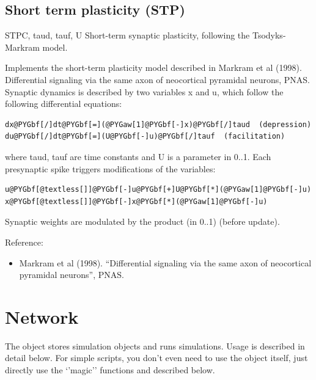 \documentclass[letterpaper,10pt,english]{manual}
\begin{document}
\subsection{Short term plasticity (STP)}

\hypertarget{brian.STP}{}\begin{classdesc}{STP}{C, taud, tauf, U}
Short-term synaptic plasticity, following the Tsodyks-Markram model.

Implements the short-term plasticity model described in Markram et al (1998).
Differential signaling via the same axon of
neocortical pyramidal neurons, PNAS.
Synaptic dynamics is described by two variables x and u, which follow
the following differential equations:

\begin{Verbatim}[commandchars=@\[\]]
dx@PYGbf[/]dt@PYGbf[=](@PYGaw[1]@PYGbf[-]x)@PYGbf[/]taud  (depression)
du@PYGbf[/]dt@PYGbf[=](U@PYGbf[-]u)@PYGbf[/]tauf  (facilitation)
\end{Verbatim}

where taud, tauf are time constants and U is a parameter in 0..1. Each presynaptic
spike triggers modifications of the variables:

\begin{Verbatim}[commandchars=@\[\]]
u@PYGbf[@textless[]]@PYGbf[-]u@PYGbf[+]U@PYGbf[*](@PYGaw[1]@PYGbf[-]u)
x@PYGbf[@textless[]]@PYGbf[-]x@PYGbf[*](@PYGaw[1]@PYGbf[-]u)
\end{Verbatim}

Synaptic weights are modulated by the product  (in 0..1) (before update).

Reference:
\begin{itemize}
\item {} 
Markram et al (1998). ``Differential signaling via the same axon of
neocortical pyramidal neurons'', PNAS.

\end{itemize}
\end{classdesc}

\resetcurrentobjects
\hypertarget{--doc-reference-network}{}

\section{Network}

The \hyperlink{brian.Network}{} object stores simulation objects and runs simulations. Usage
is described in detail below. For simple scripts, you don't even need to
use the \hyperlink{brian.Network}{} object itself, just directly use the `'magic'' functions
\hyperlink{brian.run}{} and \hyperlink{brian.reinit}{} described below.
\end{document}

